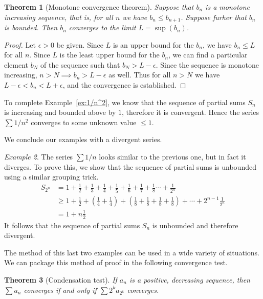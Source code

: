 \documentclass[11pt,oneside]{amsbook}
\theoremstyle{definition}
\theoremstyle{plain}
\newtheorem{thm}{Theorem}[section]
\theoremstyle{definition}
\theoremstyle{remark}
\newtheorem{example}[thm]{Example}
\numberwithin{equation}{section}
\numberwithin{figure}{section}
\begin{document}
\begin{thm}[Monotone convergence theorem]
  Suppose that $b_n$ is a monotone increasing sequence, that is, for all $n$ we have $b_n\leq b_{n+1}$. Suppose furher that $b_n$ is bounded. Then $b_n$ converges to the limit $L=\sup(b_n)$.
\end{thm}

\begin{proof}
  Let $\epsilon>0$ be given. Since $L$ is an upper bound for the $b_n$, we have $b_n\leq L$ for all $n$. Since $L$ is the least upper bound for the $b_n$, we can find a particular element $b_N$ of the sequence such that $b_N>L-\epsilon$. Since the sequence is monotone increasing, $n>N\implies b_n>L-\epsilon$ as well. Thus for all $n>N$ we have $L-\epsilon<b_n<L+\epsilon$, and the convergence is established.
\end{proof}

To complete Example~\ref{ex:1/n^2}, we know that the sequence of partial sums $S_n$ is increasing and bounded above by $1$, therefore it is convergent. Hence the series $\sum1/n^2$ converges to some unknown value $\leq1$.

We conclude our examples with a divergent series.

\begin{example}
  The series $\sum 1/n$ looks similar to the previous one, but in fact it diverges. To prove this, we show that the sequence of partial sums is unbounded using a similar grouping trick.
\begin{align*}
  S_{2^n} &= 1+\frac12+\frac13+\frac14+\frac15+\frac16+\frac17+\frac18
            \cdots+\frac1{2^n}\\
          &\geq 1+\frac12+\left(\frac14+\frac14\right)
            +\left(\frac18+\frac18+\frac18+\frac18\right)
            +\cdots+2^{n-1}\frac1{2^n}\\
          &=1+n\frac12
\end{align*}
It follows that the sequence of partial sums $S_n$ is unbounded and therefore divergent.
\end{example}

The method of this last two examples can be used in a wide variety of situations. We can package this method of proof in the following convergence test.

\begin{thm}[Condensation test]
  If $a_n$ is a positive, decreasing sequence, then $\sum a_n$ converges if and only if $\sum2^ka_{2^k}$ converges.
\end{thm}
\end{document}
